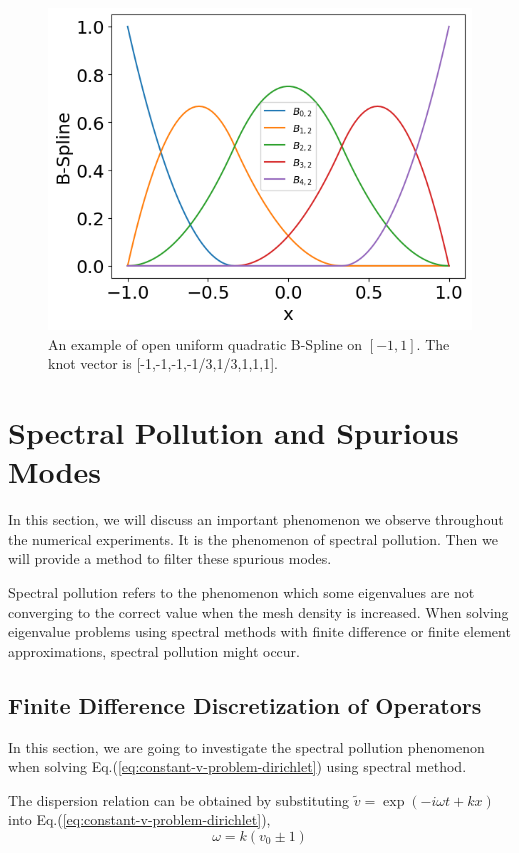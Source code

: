 \begin{figure} [H]
	\centering
	\includegraphics[width=0.7\linewidth]{figures/bspline}
	\caption{An example of open uniform quadratic B-Spline on $[-1,1]$. The knot vector is [-1,-1,-1,-1/3,1/3,1,1,1].}
	\label{fig:bspline}
\end{figure}



\section{Spectral Pollution and Spurious Modes}
In this section, we will discuss an important phenomenon we observe throughout the numerical experiments. It is the phenomenon of spectral pollution. Then we will provide a method to filter these spurious modes.

Spectral pollution refers to the phenomenon which some eigenvalues are not converging to the correct value when the mesh density is increased. When solving eigenvalue problems using spectral methods with finite difference or finite element approximations, spectral pollution might occur. \cite{llobet_spectral_1990}

\subsection{Finite Difference Discretization of Operators}
In this section, we are going to investigate the spectral pollution phenomenon when solving Eq.(\ref{eq:constant-v-problem-dirichlet}) using spectral method.

The dispersion relation can be obtained by substituting $\tilde{v} = \exp(-i\omega t + kx)$ into Eq.(\ref{eq:constant-v-problem-dirichlet}),
\begin{equation} \label{dispersion-relation}
	\omega = k(v_0 \pm 1)
\end{equation}


